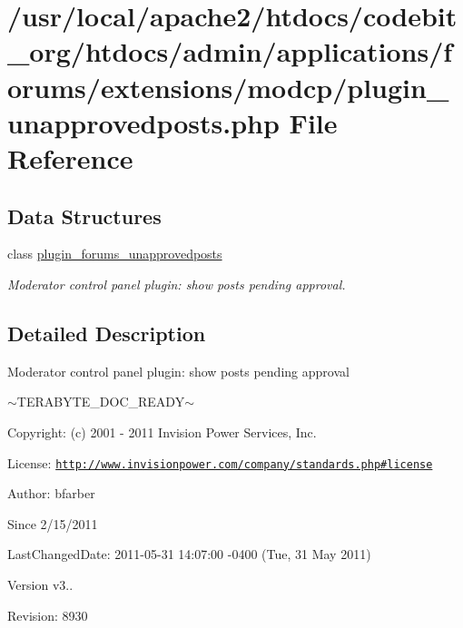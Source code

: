 \hypertarget{plugin__unapprovedposts_8php}{\section{/usr/local/apache2/htdocs/codebit\-\_\-org/htdocs/admin/applications/forums/extensions/modcp/plugin\-\_\-unapprovedposts.php File Reference}
\label{plugin__unapprovedposts_8php}
}
\subsection*{Data Structures}
\begin{DoxyCompactItemize}
\item 
class \hyperlink{classplugin__forums__unapprovedposts}{plugin\-\_\-forums\-\_\-unapprovedposts}
\begin{DoxyCompactList}\small\item\em Moderator control panel plugin\-: show posts pending approval. \end{DoxyCompactList}\end{DoxyCompactItemize}


\subsection{Detailed Description}
\begin{DoxyVerb}  Moderator control panel plugin: show posts pending approval
\end{DoxyVerb}
 $\sim$\-T\-E\-R\-A\-B\-Y\-T\-E\-\_\-\-D\-O\-C\-\_\-\-R\-E\-A\-D\-Y$\sim$ \begin{DoxyParagraph}{Copyright\-:}
(c) 2001 -\/ 2011 Invision Power Services, Inc.
\end{DoxyParagraph}
\begin{DoxyParagraph}{License\-:}
\href{http://www.invisionpower.com/company/standards.php#license}{\tt http\-://www.\-invisionpower.\-com/company/standards.\-php\#license}
\end{DoxyParagraph}
\begin{DoxyParagraph}{Author\-:}
bfarber 
\end{DoxyParagraph}
\begin{DoxySince}{Since}
2/15/2011 
\end{DoxySince}
\begin{DoxyParagraph}{Last\-Changed\-Date\-:}
2011-\/05-\/31 14\-:07\-:00 -\/0400 (Tue, 31 May 2011) 
\end{DoxyParagraph}
\begin{DoxyVersion}{Version}
v3.. 
\end{DoxyVersion}
\begin{DoxyParagraph}{Revision\-:}
8930 
\end{DoxyParagraph}
